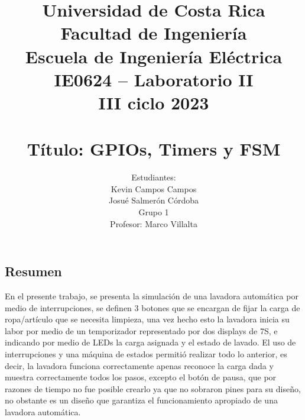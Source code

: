 \documentclass[12pt,a4paper]{article}
\author{Estudiantes:\\ Kevin Campos Campos\\ Josué Salmerón Córdoba  \\{\small Grupo 1}\\ Profesor:  Marco Villalta  \vspace*{3.0in}}
\title{Universidad de Costa Rica\\{\small Facultad de Ingeniería\\Escuela de Ingeniería Eléctrica\\IE0624 – Laboratorio II\\III ciclo 2023\\\vspace*{0.55in}}\\ Título: GPIOs, Timers y FSM  \vspace*{1.35in}}
\begin{document}
 

\maketitle  
\thispagestyle{empty}%
\renewcommand{\thepage}{\roman{page}}
\newpage
\tableofcontents
\newpage
\listoffigures 
\newpage
\listoftables  
\newpage
\renewcommand{\thepage}{\arabic{page}} 
\setcounter{page}{1}
\begin{center}
\section{Resumen}
En el presente trabajo, se presenta la simulación de una lavadora automática por medio de interrupciones, se definen 3 botones que se encargan de fijar la carga de ropa/artículo que se necesita limpieza, una vez hecho esto la lavadora inicia su labor por medio de un temporizador representado por dos displays de 7S, e indicando por medio de LEDs la carga asignada y el estado de lavado. El uso de interrupciones y una máquina de estados permitió realizar todo lo anterior, es decir, la lavadora funciona correctamente apenas reconoce la carga dada y muestra correctamente todos los pasos, excepto el botón de pausa, que por razones de tiempo no fue posible crearlo ya que no sobraron pines para su diseño, no obstante es un diseño que garantiza el funcionamiento apropiado de una lavadora automática.
\end{center}


   
\newpage  


%





\newpage 


 
\end{document}
